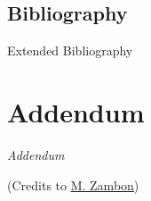 \documentclass[10pt]{beamer}
\begin{document}
\subsection{Bibliography}
\begin{frame}[t,allowframebreaks]{Extended Bibliography}
	
	
\end{frame}


\section{Addendum}
\begin{frame}
	\begin{center}
	\Huge\emph{Addendum}
	
	\vspace{1em}
	\small(Credits to \href{https://www.icmat.es/congresos/2022/poisson-ggi/program.php}{M. Zambon})
	\end{center}
\end{frame}
\addtocounter{framenumber}{-1}







\end{document}
